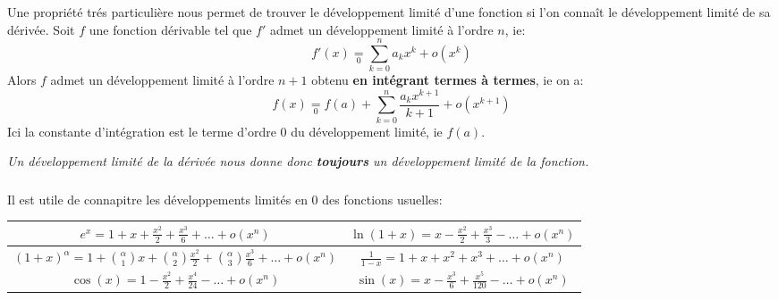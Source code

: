 Une propriété trés particulière nous permet de trouver le développement limité d'une fonction si l'on connaît le développement limité de sa dérivée.\+ 
Soit \(f\) une fonction dérivable tel que \(f'\) admet un développement limité à l'ordre \(n\), ie:
\[
   f'(x) \underset{0}{=} \sum_{k=0}^{n} a_kx^k + o(x^k)   
\]
Alors \(f\) admet un développement limité à l'ordre \(n + 1\) obtenu \textbf{en intégrant termes à termes}, ie on a:
\[
   f(x) \underset{0}{=} f(a) + \sum_{k=0}^{n} \frac{a_k x^{k+1}}{k+1} + o(x^{k+1})   
\]
Ici la constante d'intégration est le terme d'ordre 0 du développement limité, ie \(f(a)\).
\begin{center}
   \textit{
      Un développement limité de la dérivée nous donne donc \textbf{toujours}\+
      un développement limité de la fonction.
   }
\end{center}

\subsection*{}

Il est utile de connapitre les développements limités en \(0\) des fonctions usuelles:
\begin{center}
   \renewcommand{\arraystretch}{1.5}%
   \setlength\arrayrulewidth{0.8pt}

   \begin{tabular}{| c | c |}
   \hline
   \(e^x = 1 + x + \frac{x^2}{2} + \frac{x^3}{6} + \ldots + o(x^n)\) & \(\ln(1 + x) = x - \frac{x^2}{2} + \frac{x^3}{3} - \ldots + o(x^n) \)\\[1.5ex]
   \hline
   \((1+x)^\alpha = 1 + \binom{\alpha}{1} x + \binom{\alpha}{2}\frac{x^2}{2} + \binom{\alpha}{3}\frac{x^3}{6} + \ldots + o(x^n)\) & \(\frac{1}{1-x} = 1 + x + x^2 + x^3 + \ldots + o(x^n)\) \\[1.5ex]
   \hline
   \(\cos(x) = 1 - \frac{x^2}{2} + \frac{x^4}{24} - \ldots + o(x^n)\) & \(\sin(x) = x - \frac{x^3}{6} + \frac{x^5}{120} - \ldots + o(x^n)\) \\[1.5ex]   
   \hline
   \end{tabular}
\end{center} 

\chapter*{} %

